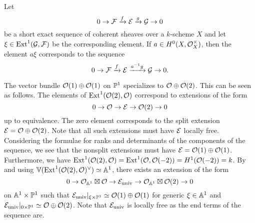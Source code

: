 \begin{remark} \label{rem:scalars-on-ext} Let
	\[ \sesarrows{\mc{F}}{f}{\mc{E}}{g}{\mc{G}} \]
	be a short exact sequence of coherent sheaves over a $k$-scheme $X$ and let $\xi \in \Ext^1(\mc{G},\mc{F})$ be the corresponding element. If $a \in H^0(X,\mc{O}^{\times}_X)$, then the element $a\xi$ corresponds to the sequence
	\[ \sesarrows{\mc{F}}{f}{\mc{E}}{a^{-1}g}{\mc{G}}.\]
\end{remark}

\begin{example}
	The vector bundle $\mc{O}(1)\oplus \mc{O}(1)$ on $\PP^1$ specializes to $\mc{O}\oplus \mc{O}(2)$.
	This can be seen as follows.
	The elements of $\Ext^1(\mc{O}(2),\mc{O})$ correspond to extensions of the form
	\[ \ses{\mc{O}}{\mc{E}}{\mc{O}(2)}\]
	up to equivalence. The zero element corresponds to the split extension $\mc{E} = \mc{O} \oplus \mc{O}(2)$.
	Note that all such extensions must have $\mc{E}$ locally free.
	Considering the formulae for ranks and determinants of the components of the sequence, we see that the nonsplit extensions must have
	$\mc{E}=\mc{O}(1)\oplus\mc{O}(1)$.
	Furthermore, we have $\Ext^1(\mc{O}(2),\mc{O}) = \Ext^1(\mc{O},\mc{O}(-2))=H^1(\mc{O}(-2))=k$.
	By  and using $\VV(\Ext^1(\mc{O}(2),\mc{O})\dual)\simeq \AA^1$, there exists an extension of the form
	\[\ses{\mc{O}_{\AA^1} \boxtimes \mc{O}}{\mc{E}_{\text{univ}}}{\mc{O}_{\AA^1}\boxtimes \mc{O}(2)}\]
	on $\AA^1\times \PP^1$
	such that
	$\mc{E}_{\text{univ}}|_{\xi \times \PP^1} \simeq \mc{O}(1)\oplus\mc{O}(1)$
	for generic $\xi\in\AA^1$
	and 
	$\mc{E}_{\text{univ}}|_{0\times \PP^1} \simeq \mc{O} \oplus \mc{O}(2)$.
	Note that $\mc{E}_{\text{univ}}$ is locally free as the end terms of the sequence are.
\end{example}


